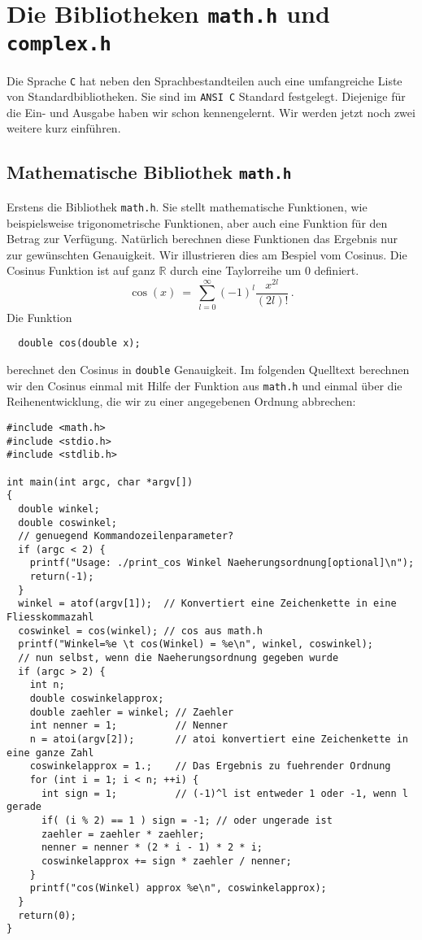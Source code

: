 \section{Die Bibliotheken \texttt{math.h} und \texttt{complex.h}}

Die Sprache \texttt{C} hat neben den Sprachbestandteilen auch eine umfangreiche Liste von Standardbibliotheken.
Sie sind im \texttt{ANSI C} Standard festgelegt.
Diejenige für die Ein- und Ausgabe haben wir schon kennengelernt.
Wir werden jetzt noch zwei weitere kurz einführen.

\subsection{Mathematische Bibliothek \texttt{math.h}}

Erstens die Bibliothek \texttt{math.h}.
Sie stellt mathematische Funktionen, wie beispielsweise trigonometrische Funktionen, aber auch eine Funktion für den Betrag zur Verfügung.
Natürlich berechnen diese Funktionen das Ergebnis nur zur gewünschten Genauigkeit.
Wir illustrieren dies am Bespiel vom Cosinus.
Die Cosinus Funktion ist auf ganz $\mathbb{R}$ durch eine Taylorreihe um 0 definiert.
\begin{equation}
  \label{eq:cos}
  \cos\left(x\right)\ =\ \sum_{l=0}^{\infty} \left(-1\right)^{l} \dfrac{x^{2l}}{\left(2l\right)!}\,.
\end{equation}
Die Funktion 
\begin{lstlisting}
  double cos(double x);
\end{lstlisting}
berechnet den Cosinus in \texttt{double} Genauigkeit.
Im folgenden Quelltext berechnen wir den Cosinus einmal mit Hilfe der Funktion aus \texttt{math.h} und einmal über die Reihenentwicklung, die wir zu einer angegebenen Ordnung abbrechen:
\begin{lstlisting}[caption={Beispiel zur Verwendung des Cosinus}, belowcaptionskip=0.3em]
#include <math.h>
#include <stdio.h>
#include <stdlib.h>

int main(int argc, char *argv[])
{
  double winkel;
  double coswinkel;
  // genuegend Kommandozeilenparameter?
  if (argc < 2) {
    printf("Usage: ./print_cos Winkel Naeherungsordnung[optional]\n");
    return(-1);
  }
  winkel = atof(argv[1]);  // Konvertiert eine Zeichenkette in eine Fliesskommazahl
  coswinkel = cos(winkel); // cos aus math.h
  printf("Winkel=%e \t cos(Winkel) = %e\n", winkel, coswinkel);
  // nun selbst, wenn die Naeherungsordnung gegeben wurde
  if (argc > 2) {
    int n;
    double coswinkelapprox;
    double zaehler = winkel; // Zaehler
    int nenner = 1;          // Nenner
    n = atoi(argv[2]);       // atoi konvertiert eine Zeichenkette in eine ganze Zahl
    coswinkelapprox = 1.;    // Das Ergebnis zu fuehrender Ordnung
    for (int i = 1; i < n; ++i) {
      int sign = 1;          // (-1)^l ist entweder 1 oder -1, wenn l gerade
      if( (i % 2) == 1 ) sign = -1; // oder ungerade ist
      zaehler = zaehler * zaehler;
      nenner = nenner * (2 * i - 1) * 2 * i;
      coswinkelapprox += sign * zaehler / nenner;
    }
    printf("cos(Winkel) approx %e\n", coswinkelapprox);
  }
  return(0);
}
\end{lstlisting}
